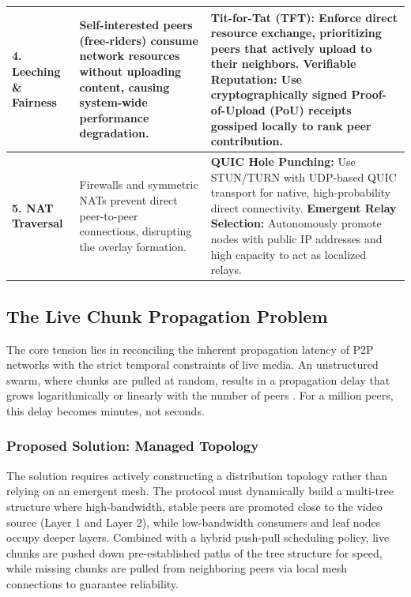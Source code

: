 \documentclass[journal]{IEEEtran}
\begin{document}
\begin{table}[t]
\begin{tabular}{lp{6.2cm}p{7.8cm}}
\textbf{4. Leeching \& Fairness} & 
Self-interested peers (free-riders) consume network resources without uploading content, causing system-wide performance degradation. & 
\textbf{Tit-for-Tat (TFT):} Enforce direct resource exchange, prioritizing peers that actively upload to their neighbors. \newline
\textbf{Verifiable Reputation:} Use cryptographically signed Proof-of-Upload (PoU) receipts gossiped locally to rank peer contribution. \\ \midrule

\textbf{5. NAT Traversal} & 
Firewalls and symmetric NATs prevent direct peer-to-peer connections, disrupting the overlay formation. & 
\textbf{QUIC Hole Punching:} Use STUN/TURN with UDP-based QUIC transport for native, high-probability direct connectivity. \newline
\textbf{Emergent Relay Selection:} Autonomously promote nodes with public IP addresses and high capacity to act as localized relays. \\ \bottomrule
\end{tabular}
\end{table}

\subsection{The Live Chunk Propagation Problem}
The core tension lies in reconciling the inherent propagation latency of P2P networks with the strict temporal constraints of live media. An unstructured swarm, where chunks are pulled at random, results in a propagation delay that grows logarithmically or linearly with the number of peers \cite{kumar2019chunk}. For a million peers, this delay becomes minutes, not seconds.

\subsubsection{Proposed Solution: Managed Topology}
The solution requires actively constructing a distribution topology rather than relying on an emergent mesh. The protocol must dynamically build a multi-tree structure where high-bandwidth, stable peers are promoted close to the video source (Layer 1 and Layer 2), while low-bandwidth consumers and leaf nodes occupy deeper layers. Combined with a hybrid push-pull scheduling policy, live chunks are pushed down pre-established paths of the tree structure for speed, while missing chunks are pulled from neighboring peers via local mesh connections to guarantee reliability.
\end{document}
